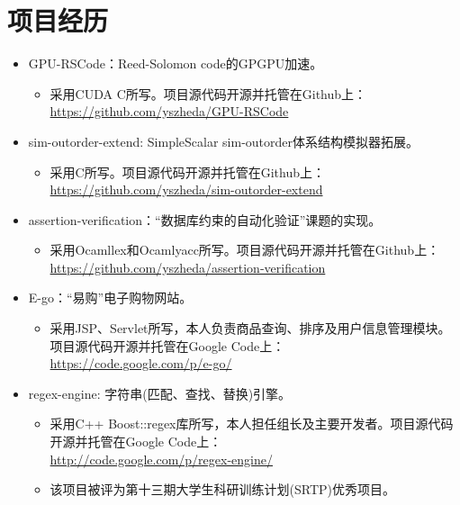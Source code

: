 \documentclass[letterpaper]{article}
\begin{document}
\section*{项目经历}
\begin{itemize}
  \item GPU-RSCode：Reed-Solomon code的GPGPU加速。
	\begin{itemize}
	  \item 采用CUDA C所写。项目源代码开源并托管在Github上：\\
			  \url{https://github.com/yszheda/GPU-RSCode}
	\end{itemize}
  \item sim-outorder-extend: SimpleScalar sim-outorder体系结构模拟器拓展。
	\begin{itemize}
	  \item 采用C所写。项目源代码开源并托管在Github上：\\
			  \url{https://github.com/yszheda/sim-outorder-extend}
	\end{itemize}
  \item assertion-verification：``数据库约束的自动化验证''课题的实现。
	\begin{itemize}
	  \item 采用Ocamllex和Ocamlyacc所写。项目源代码开源并托管在Github上：\\
			  \url{https://github.com/yszheda/assertion-verification}
	\end{itemize}
  \item E-go：``易购''电子购物网站。
	\begin{itemize}
	  \item 采用JSP、Servlet所写，本人负责商品查询、排序及用户信息管理模块。项目源代码开源并托管在Google Code上：\\
			  \url{https://code.google.com/p/e-go/}
	\end{itemize}
  \item regex-engine: 字符串(匹配、查找、替换)引擎。
    \begin{itemize}
	  \item 采用C++ Boost::regex库所写，本人担任组长及主要开发者。项目源代码开源并托管在Google Code上：\\
			  \url{http://code.google.com/p/regex-engine/}
      \item 该项目被评为第十三期大学生科研训练计划(SRTP)优秀项目。
%
	\end{itemize}


\end{itemize}
\end{document}
